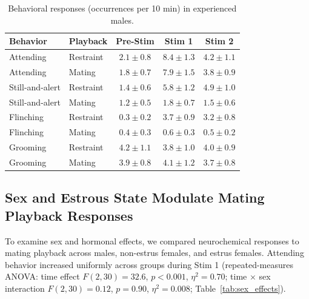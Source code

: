 \documentclass[11pt]{article}
\begin{document}
\begin{table}[H]
\centering
\caption{Behavioral responses (occurrences per 10 min) in experienced males.}
\label{tab:male_behav}
\begin{tabular}{llccc}
\toprule
\textbf{Behavior} & \textbf{Playback} & \textbf{Pre-Stim} & \textbf{Stim 1} & \textbf{Stim 2} \\
\midrule
Attending & Restraint & $2.1 \pm 0.8$ & $8.4 \pm 1.3$ & $4.2 \pm 1.1$ \\
Attending & Mating & $1.8 \pm 0.7$ & $7.9 \pm 1.5$ & $3.8 \pm 0.9$ \\
Still-and-alert & Restraint & $1.4 \pm 0.6$ & $5.8 \pm 1.2$ & $4.9 \pm 1.0$ \\
Still-and-alert & Mating & $1.2 \pm 0.5$ & $1.8 \pm 0.7$ & $1.5 \pm 0.6$ \\
Flinching & Restraint & $0.3 \pm 0.2$ & $3.7 \pm 0.9$ & $3.2 \pm 0.8$ \\
Flinching & Mating & $0.4 \pm 0.3$ & $0.6 \pm 0.3$ & $0.5 \pm 0.2$ \\
Grooming & Restraint & $4.2 \pm 1.1$ & $3.8 \pm 1.0$ & $4.0 \pm 0.9$ \\
Grooming & Mating & $3.9 \pm 0.8$ & $4.1 \pm 1.2$ & $3.7 \pm 0.8$ \\
\bottomrule
\end{tabular}
\end{table}

\subsection{Sex and Estrous State Modulate Mating Playback Responses}

To examine sex and hormonal effects, we compared neurochemical responses to mating playback across males, non-estrus females, and estrus females. Attending behavior increased uniformly across groups during Stim 1 (repeated-measures ANOVA: time effect $F(2,30)=32.6$, $p<0.001$, $\eta^2=0.70$; time $\times$ sex interaction $F(2,30)=0.12$, $p=0.90$, $\eta^2=0.008$; Table~\ref{tab:sex_effects}).
\end{document}
